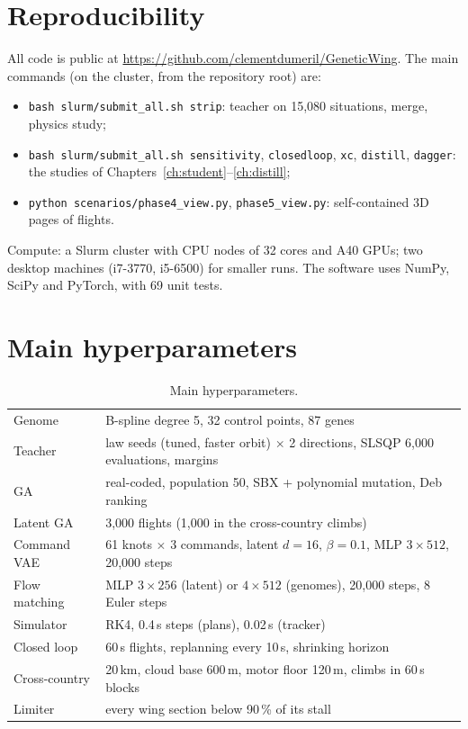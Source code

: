 \documentclass[11pt,a4paper,oneside]{report}
\begin{document}
\appendix
\chapter{Reproducibility}
All code is public at \url{https://github.com/clementdumeril/GeneticWing}. The main commands (on the cluster, from the repository root) are:
\begin{itemize}
  \item \texttt{bash slurm/submit\_all.sh strip}: teacher on 15{,}080 situations, merge, physics study;
  \item \texttt{bash slurm/submit\_all.sh sensitivity}, \texttt{closedloop}, \texttt{xc}, \texttt{distill}, \texttt{dagger}: the studies of Chapters~\ref{ch:student}--\ref{ch:distill};
  \item \texttt{python scenarios/phase4\_view.py}, \texttt{phase5\_view.py}: self-contained 3D pages of flights.
\end{itemize}
Compute: a Slurm cluster with CPU nodes of 32 cores and A40 GPUs; two desktop machines (i7-3770, i5-6500) for smaller runs. The software uses NumPy, SciPy and PyTorch, with 69 unit tests.

\chapter{Main hyperparameters}
\begin{table}[ht]\centering\small
\caption{Main hyperparameters.}\label{tab:hyper}
\begin{tabular}{@{}ll@{}}
\toprule
Genome & B-spline degree 5, 32 control points, 87 genes \\
Teacher & law seeds (tuned, faster orbit) $\times$ 2 directions, SLSQP 6{,}000 evaluations, margins \\
GA & real-coded, population 50, SBX + polynomial mutation, Deb ranking \\
Latent GA & 3{,}000 flights (1{,}000 in the cross-country climbs) \\
Command VAE & 61 knots $\times$ 3 commands, latent $d=16$, $\beta = 0.1$, MLP $3\times512$, 20{,}000 steps \\
Flow matching & MLP $3\times256$ (latent) or $4\times512$ (genomes), 20{,}000 steps, 8 Euler steps \\
Simulator & RK4, 0.4\,s steps (plans), 0.02\,s (tracker) \\
Closed loop & 60\,s flights, replanning every 10\,s, shrinking horizon \\
Cross-country & 20\,km, cloud base 600\,m, motor floor 120\,m, climbs in 60\,s blocks \\
Limiter & every wing section below 90\,\% of its stall \\
\bottomrule
\end{tabular}
\end{table}
\end{document}
